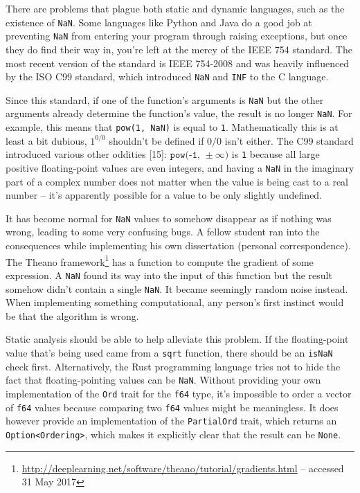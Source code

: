 \documentclass[a4paper, 16pt, oneside]{Thesis}
\begin{document}
There are problems that plague both static and dynamic languages, such
as the existence of \texttt{NaN}. Some languages like Python and Java do
a good job at preventing \texttt{NaN} from entering your program through
raising exceptions, but once they do find their way in, you're left at
the mercy of the IEEE 754 standard. The most recent version of the
standard is IEEE 754-2008 and was heavily influenced by the ISO C99
standard, which introduced \texttt{NaN} and \texttt{INF} to the C
language.

Since this standard, if one of the function's arguments is \texttt{NaN}
but the other arguments already determine the function's value, the
result is no longer \texttt{NaN}. For example, this means that
\texttt{pow(1,\ NaN)} is equal to \texttt{1}. Mathematically this is at
least a bit dubious, \(1^{0/0}\) shouldn't be defined if \(0/0\) isn't
either. The C99 standard introduced various other oddities {[}15{]}:
\(\texttt{pow(-1, }\pm \infty\texttt{)}\) is \texttt{1} because all
large positive floating-point values are even integers, and having a
\texttt{NaN} in the imaginary part of a complex number does not matter
when the value is being cast to a real number -- it's apparently
possible for a value to be only slightly undefined.

It has become normal for \texttt{NaN} values to somehow disappear as if
nothing was wrong, leading to some very confusing bugs. A fellow student
ran into the consequences while implementing his own dissertation
(personal correspondence). The Theano framework\footnote{\url{http://deeplearning.net/software/theano/tutorial/gradients.html}
  -- accessed 31 May 2017} has a function to compute the gradient of
some expression. A \texttt{NaN} found its way into the input of this
function but the result somehow didn't contain a single \texttt{NaN}. It
became seemingly random noise instead. When implementing something
computational, any person's first instinct would be that the algorithm
is wrong.

Static analysis should be able to help alleviate this problem. If the
floating-point value that's being used came from a \texttt{sqrt}
function, there should be an \texttt{isNaN} check first. Alternatively,
the Rust programming language tries not to hide the fact that
floating-pointing values can be \texttt{NaN}. Without providing your own
implementation of the \texttt{Ord} trait for the \texttt{f64} type, it's
impossible to order a vector of \texttt{f64} values because comparing
two \texttt{f64} values might be meaningless. It does however provide an
implementation of the \texttt{PartialOrd} trait, which returns an
\texttt{Option\textless{}Ordering\textgreater{}}, which makes it
explicitly clear that the result can be \texttt{None}.
\end{document}
